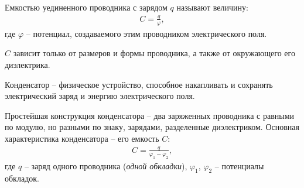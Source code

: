 \documentclass[__main__.tex]{subfiles}
\begin{document}
\begin{definition}
    Емкостью уединенного проводника с зарядом $q$ называют величину:
    \begin{gather}
        C=\frac{q}{\varphi},
    \end{gather}
    где $\varphi$ -- потенциал, создаваемого этим проводником электрического поля.
\end{definition}
$C$ зависит только от размеров и формы проводника, а также от окружающего его диэлектрика.

\begin{definition}
    Конденсатор -- физическое устройство, способное накапливать и сохранять электрический заряд и энергию электрического поля.
\end{definition}
Простейшая конструкция конденсатора -- два заряженных проводника с равными по модулю, но разными по знаку, зарядами, разделенные диэлектриком. Основная характеристика конденсатора -- его емкость $C$:
\begin{gather}
    C=\frac{q}{\varphi_1-\varphi_2},
\end{gather}
где $q$ -- заряд одного проводника (\emph{одной обкладки}), $\varphi_1$, $\varphi_2$ -- потенциалы обкладок.
\end{document}
